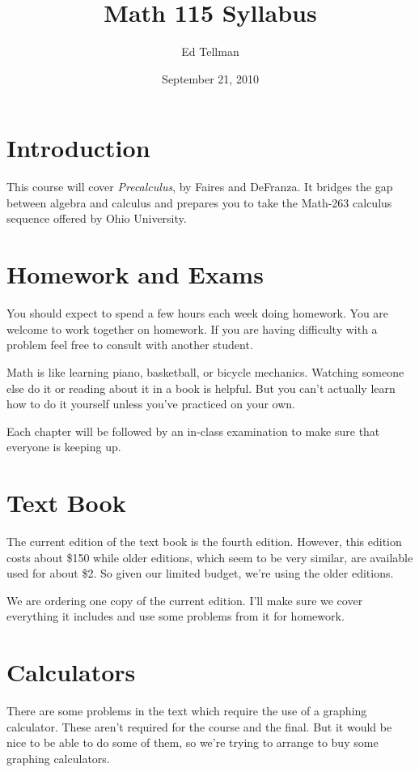 \documentclass{article}
\title{Math 115 Syllabus}
\date{September 21, 2010}
\author{Ed Tellman}
\begin{document}
\maketitle

\section{Introduction}
This course will cover {\em Precalculus}, by Faires and DeFranza.  It bridges the gap between algebra and calculus and
prepares you to take the Math-263 calculus sequence offered by Ohio University.

\section{Homework and Exams}
You should expect to spend a few hours each week doing homework.  You are welcome to work together on homework.
If you are having difficulty with a problem feel free to consult with another student.

Math is like learning piano, basketball, or bicycle mechanics.  Watching someone else do it or reading about it in a
book is helpful.  But you can't actually learn how to do it yourself unless you've practiced on your own.


Each chapter will be followed by an in-class examination to make sure that everyone is keeping up.

\section{Text Book}
The current edition of the text book is the fourth edition.  However, this edition costs about \$150 while older
editions, which seem to be very similar, are available used for about \$2.  So given our limited budget, we're using
the older editions.

We are ordering one copy of the current edition.  I'll make sure we cover everything it includes and use some problems
from it for homework.

\section{Calculators}
There are some problems in the text which require the use of a graphing calculator.  These aren't required for the
course and the final.  But it would be nice to be able to do some of them, so we're trying to arrange to buy some 
graphing calculators.
\end{document}
